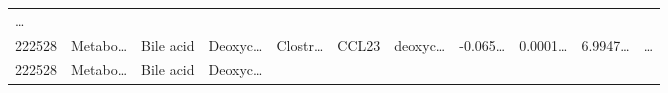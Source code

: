 \documentclass[
]{article}
\begin{document}
\begin{longtable}[]{@{}lllllllllll@{}}
\begin{minipage}[t]{0.03\columnwidth}
\ldots{}\strut
\end{minipage}\tabularnewline
\begin{minipage}[t]{0.05\columnwidth}\raggedright
222528\strut
\end{minipage} & \begin{minipage}[t]{0.07\columnwidth}\raggedright
Metabo\ldots{}\strut
\end{minipage} & \begin{minipage}[t]{0.07\columnwidth}\raggedright
Bile acid\strut
\end{minipage} & \begin{minipage}[t]{0.09\columnwidth}\raggedright
Deoxyc\ldots{}\strut
\end{minipage} & \begin{minipage}[t]{0.07\columnwidth}\raggedright
Clostr\ldots{}\strut
\end{minipage} & \begin{minipage}[t]{0.07\columnwidth}\raggedright
CCL23\strut
\end{minipage} & \begin{minipage}[t]{0.09\columnwidth}\raggedright
deoxyc\ldots{}\strut
\end{minipage} & \begin{minipage}[t]{0.07\columnwidth}\raggedright
-0.065\ldots{}\strut
\end{minipage} & \begin{minipage}[t]{0.07\columnwidth}\raggedright
0.0001\ldots{}\strut
\end{minipage} & \begin{minipage}[t]{0.07\columnwidth}\raggedright
6.9947\ldots{}\strut
\end{minipage} & \begin{minipage}[t]{0.03\columnwidth}\raggedright
\ldots{}\strut
\end{minipage}\tabularnewline
\begin{minipage}[t]{0.05\columnwidth}\raggedright
222528\strut
\end{minipage} & \begin{minipage}[t]{0.07\columnwidth}\raggedright
Metabo\ldots{}\strut
\end{minipage} & \begin{minipage}[t]{0.07\columnwidth}\raggedright
Bile acid\strut
\end{minipage} & \begin{minipage}[t]{0.09\columnwidth}\raggedright
Deoxyc\ldots{}\strut
\end{minipage} & \begin{minipage}[t]{0.07\columnwidth}\raggedright

\end{minipage}
\end{longtable}
\end{document}

